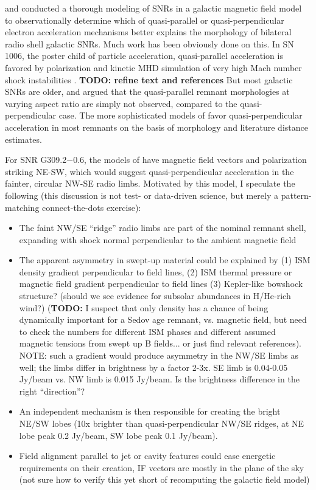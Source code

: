 \documentclass[twocolumn,tighten,trackchanges]{aastex61}
\newcommand*{\Gsnr}{G309.2$-$0.6}
\begin{document}
\citet{west2016} and \citet{west2017} conducted a thorough modeling of SNRs in
a galactic magnetic field model to observationally determine which of
quasi-parallel or quasi-perpendicular electron acceleration mechanisms better
explains the morphology of bilateral radio shell galactic SNRs.
Much work has been obviously done on this.
In SN 1006, the poster child of particle acceleration, quasi-parallel
acceleration is favored by polarization \citep{reynoso2013} and kinetic MHD
simulation of very high Mach number shock instabilities \citep{caprioli2014-I}.
\textbf{TODO: refine text and references}
But most galactic SNRs are older, and \citet{fulbright1990} argued that
the quasi-parallel remnant morphologies at varying aspect ratio are simply not
observed, compared to the quasi-perpendicular case.
The more sophisticated models of \citet{west2017} favor quasi-perpendicular
acceleration in most remnants on the basis of morphology and literature
distance estimates.

For SNR \Gsnr{}, the models of \citet{west2016} have magnetic field vectors and
polarization striking NE-SW, which would suggest quasi-perpendicular
acceleration in the fainter, circular NW-SE radio limbs.
Motivated by this model, I speculate the following (this discussion is not
test- or data-driven science, but merely a pattern-matching connect-the-dots
exercise):

\begin{itemize}
    \item The faint NW/SE ``ridge'' radio limbs are part of the nominal remnant
        shell, expanding with shock normal perpendicular to the ambient
        magnetic field
    \item The apparent asymmetry in swept-up material could be explained by
        (1) ISM density gradient perpendicular to field lines,
        (2) ISM thermal pressure or magnetic field gradient perpendicular to
        field lines
        (3) Kepler-like bowshock structure? (should we see evidence for
        subsolar abundances in H/He-rich wind?)
        (\textbf{TODO:} I suspect that only density has a chance of being
        dynamically important for a Sedov age remnant, vs. magnetic field, but
        need to check the numbers for different ISM phases
        and different assumed magnetic tensions from swept up B fields... or just find
        relevant references).
        NOTE: such a gradient would produce asymmetry in the NW/SE limbs as
        well; the limbs differ in brightness by a factor 2-3x.
        SE limb is 0.04-0.05 Jy/beam vs. NW limb is 0.015 Jy/beam.
        Is the brightness difference in the right ``direction''?
    \item An independent mechanism is then responsible for creating the bright
        NE/SW lobes (10x brighter than quasi-perpendicular NW/SE ridges,
        at NE lobe peak 0.2 Jy/beam, SW lobe peak 0.1 Jy/beam).
    \item Field alignment parallel to jet or cavity features could ease
        energetic requirements on their creation, IF vectors are mostly in the
        plane of the sky (not sure how to verify this yet short of recomputing
        the \citet{jansson2012} galactic field model)
\end{itemize}
\end{document}
